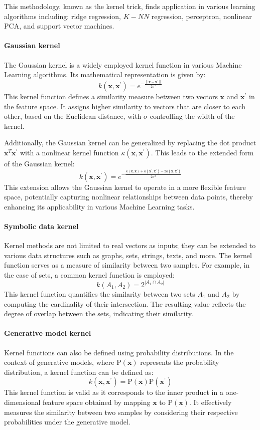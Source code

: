 This methodology, known as the kernel trick, finds application in various learning algorithms including: ridge regression, $K-NN$ regression, perceptron, nonlinear PCA, and support vector machines.

\paragraph*{Gaussian kernel}
The Gaussian kernel is a widely employed kernel function in various Machine Learning algorithms. 
Its mathematical representation is given by:
\[k(\textbf{x},\textbf{x}^\prime)=e^{-\frac{\left\lVert \textbf{x}-\textbf{x}^\prime\right\rVert}{2\sigma^2} }\]
This kernel function defines a similarity measure between two vectors $\textbf{x}$ and $\textbf{x}^\prime$ in the feature space. 
It assigns higher similarity to vectors that are closer to each other, based on the Euclidean distance, with $\sigma$ controlling the width of the kernel.

Additionally, the Gaussian kernel can be generalized by replacing the dot product $\textbf{x}^T\textbf{x}^\prime$ with a nonlinear kernel function $\kappa (\textbf{x},\textbf{x}^\prime)$. 
This leads to the extended form of the Gaussian kernel:
\[k(\textbf{x},\textbf{x}^\prime)=e^{-\frac{\kappa (\textbf{x},\textbf{x})+\kappa (\textbf{x}^\prime,\textbf{x}^\prime)-2\kappa (\textbf{x},\textbf{x}^\prime)}{2\sigma^2} }\]
This extension allows the Gaussian kernel to operate in a more flexible feature space, potentially capturing nonlinear relationships between data points, thereby enhancing its applicability in various Machine Learning tasks.

\paragraph*{Symbolic data kernel}
Kernel methods are not limited to real vectors as inputs; they can be extended to various data structures such as graphs, sets, strings, texts, and more. 
The kernel function serves as a measure of similarity between two samples.
For example, in the case of sets, a common kernel function is employed:
\[k(A_1,A_2)=2^{\left\lvert A_1 \cap A_2\right\rvert }\]
This kernel function quantifies the similarity between two sets $A_1$ and $A_2$ by computing the cardinality of their intersection. 
The resulting value reflects the degree of overlap between the sets, indicating their similarity. 

\paragraph*{Generative model kernel}
Kernel functions can also be defined using probability distributions. 
In the context of generative models, where $\text{P}(\textbf{x})$ represents the probability distribution, a kernel function can be defined as:
\[k(\textbf{x},\textbf{x}^\prime)=\text{P}(\textbf{x})\text{P}(\textbf{x}^\prime)\]
This kernel function is valid as it corresponds to the inner product in a one-dimensional feature space obtained by mapping $\textbf{x}$ to $\text{P}(\textbf{x})$. 
It effectively measures the similarity between two samples by considering their respective probabilities under the generative model. 

